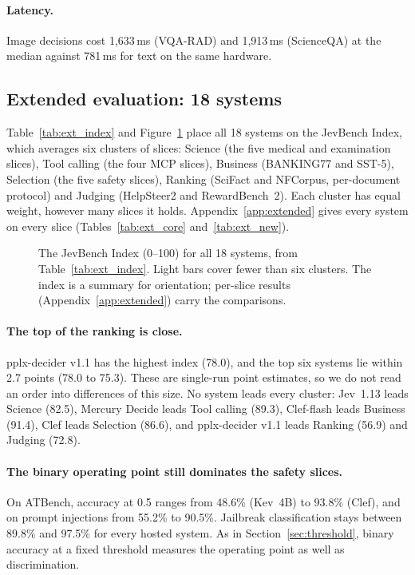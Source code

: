 \paragraph{Latency.} Image decisions cost 1{,}633\,ms (VQA-RAD) and 1{,}913\,ms (ScienceQA) at the median against 781\,ms for text on the same hardware.

\subsection{Extended evaluation: 18 systems}
\label{sec:extended}

Table~\ref{tab:ext_index} and Figure~\ref{fig:ext_index} place all 18 systems on
the JevBench Index, which averages six clusters of slices: Science (the five
medical and examination slices), Tool calling (the four MCP slices), Business
(BANKING77 and SST-5), Selection (the five safety slices), Ranking (SciFact and
NFCorpus, per-document protocol) and Judging (HelpSteer2 and RewardBench~2).
Each cluster has equal weight, however many slices it holds.
Appendix~\ref{app:extended} gives every system on every slice
(Tables~\ref{tab:ext_core} and~\ref{tab:ext_new}).



\begin{figure}[t]
\centering

\caption{The JevBench Index (0--100) for all 18 systems, from
Table~\ref{tab:ext_index}. Light bars cover fewer than six clusters. The index
is a summary for orientation; per-slice results
(Appendix~\ref{app:extended}) carry the comparisons.}
\label{fig:ext_index}
\end{figure}

\paragraph{The top of the ranking is close.} pplx-decider v1.1 has the highest
index (78.0), and the top six systems lie within 2.7 points (78.0 to 75.3).
These are single-run point estimates, so we do not read an order into
differences of this size. No system leads every cluster: Jev~1.13 leads Science
(82.5), Mercury Decide leads Tool calling (89.3), Clef-flash leads Business
(91.4), Clef leads Selection (86.6), and pplx-decider v1.1 leads Ranking (56.9)
and Judging (72.8).

\paragraph{The binary operating point still dominates the safety slices.} On
ATBench, accuracy at 0.5 ranges from 48.6\% (Kev~4B) to 93.8\% (Clef), and on
prompt injections from 55.2\% to 90.5\%. Jailbreak classification stays between
89.8\% and 97.5\% for every hosted system. As in Section~\ref{sec:threshold},
binary accuracy at a fixed threshold measures the operating point as well as
discrimination.

